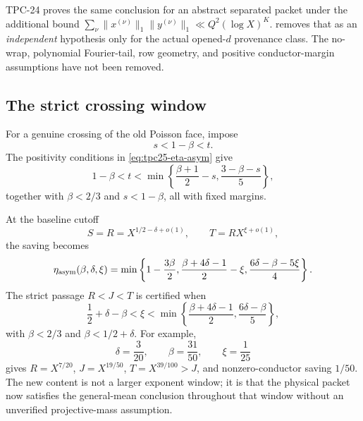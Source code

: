 \begin{remark}
\label{rem:tpc25-removed-hypothesis}
TPC-24 proves the same conclusion for an abstract separated packet
under the additional bound
\(\sum_\nu\|x^{(\nu)}\|_1\|y^{(\nu)}\|_1
 \ll Q^2(\log X)^K\).
 removes that as an
\emph{independent} hypothesis only for the actual opened-\(d\)
provenance class.  The no-wrap, polynomial Fourier-tail, row geometry,
and positive conductor-margin assumptions have not been removed.
\end{remark}

\subsection{The strict crossing window}

For a genuine crossing of the old Poisson face, impose
\begin{equation}
 s<1-\beta<t.
 \label{eq:tpc25-poisson-crossing}
\end{equation}
The positivity conditions in \eqref{eq:tpc25-eta-asym} give
\begin{equation}
 1-\beta<t<
 \min\left\{
 \frac{\beta+1}{2}-s,
 \frac{3-\beta-s}{5}
 \right\},
 \label{eq:tpc25-general-passage}
\end{equation}
together with \(\beta<2/3\) and \(s<1-\beta\), all with fixed
margins.

At the baseline cutoff
\begin{equation}
 S=R=X^{1/2-\delta+o(1)},\qquad
 T=RX^{\xi+o(1)},
 \label{eq:tpc25-baseline}
\end{equation}
the saving becomes
\begin{equation}
 \eta_{\rm asym}(\beta,\delta,\xi)
 =\min\left\{
 1-\frac{3\beta}{2},
 \frac{\beta+4\delta-1}{2}-\xi,
 \frac{6\delta-\beta-5\xi}{4}
 \right\}.
 \label{eq:tpc25-special-eta}
\end{equation}
The strict passage \(R<J<T\) is certified when
\begin{equation}
 \boxed{
 \frac12+\delta-\beta<\xi<
 \min\left\{
 \frac{\beta+4\delta-1}{2},
 \frac{6\delta-\beta}{5}
 \right\},}
 \label{eq:tpc25-special-window}
\end{equation}
with \(\beta<2/3\) and \(\beta<1/2+\delta\).  For example,
\begin{equation}
 \delta=\frac3{20},\qquad
 \beta=\frac{31}{50},\qquad
 \xi=\frac1{25}
 \label{eq:tpc25-rational-sample}
\end{equation}
gives
\(R=X^{7/20}\), \(J=X^{19/50}\),
\(T=X^{39/100}>J\), and nonzero-conductor saving \(1/50\).
The new content is not a larger exponent window; it is that the
physical packet now satisfies the general-mean conclusion throughout
that window without an unverified projective-mass assumption.
